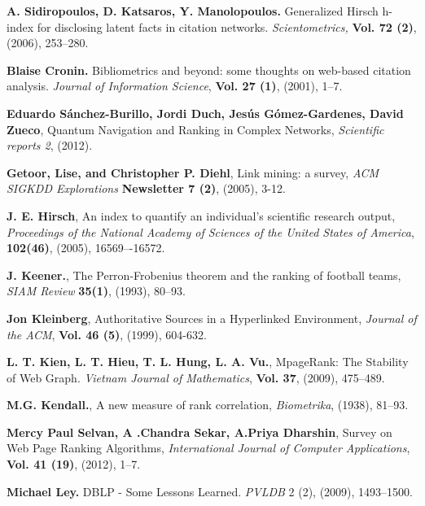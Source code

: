 \documentclass[10pt,leqno,twoside]{article}
\begin{document}
\vspace{-3ex}
\begin{thebibliography}{99}
\setlength{\parskip}{-3pt}\vspace{-2ex}

\textbf{A. Sidiropoulos, D. Katsaros, Y. Manolopoulos.}
Generalized Hirsch h-index for disclosing latent facts in citation networks.
\textit{Scientometrics,} \textbf{Vol. 72 (2)}, (2006), 253--280.

\textbf{Blaise Cronin.}
Bibliometrics and beyond: some thoughts on web-based citation analysis.
\textit{Journal of Information Science},
\textbf{Vol. 27 (1)}, (2001), 1--7.

\textbf{Eduardo Sánchez-Burillo, Jordi Duch, Jesús Gómez-Gardenes, David Zueco},
Quantum Navigation and Ranking in Complex Networks,
\textit{Scientific reports 2}, (2012).

\textbf{Getoor, Lise, and Christopher P. Diehl},
Link mining: a survey,
\textit{ACM SIGKDD Explorations}
\textbf{Newsletter 7 (2)}, (2005), 3-12.

\textbf{J. E. Hirsch},
An index to quantify an individual's scientific research output,
\textit{Proceedings of the National Academy of Sciences of the United States of America}, \textbf{102(46)}, (2005), 16569–-16572.


\textbf{J. Keener.},
The Perron-Frobenius theorem and the ranking of football teams,
\textit{SIAM Review} \textbf{ 35(1)}, (1993), 80--93.

\textbf{Jon Kleinberg},
Authoritative Sources in a Hyperlinked Environment,
\textit{Journal of the ACM}, \textbf{Vol. 46 (5)}, (1999), 604-632.


\textbf{L. T. Kien, L. T. Hieu, T. L. Hung, L. A. Vu.},
MpageRank: The Stability of Web Graph.
\textit{Vietnam Journal of Mathematics}, \textbf{Vol. 37}, (2009), 475--489.

\textbf{M.G. Kendall.},
A new measure of rank correlation,
\textit{Biometrika}, (1938), 81--93.

\textbf{Mercy Paul Selvan, A .Chandra Sekar, A.Priya Dharshin},
Survey on Web Page Ranking Algorithms,
\textit{International Journal of Computer Applications},
\textbf{Vol. 41 (19)}, (2012), 1--7.
%

\textbf{Michael Ley.}
DBLP - Some Lessons Learned.
\textit{PVLDB} 2 (2), (2009), 1493--1500.



\end{thebibliography}
\end{document}

